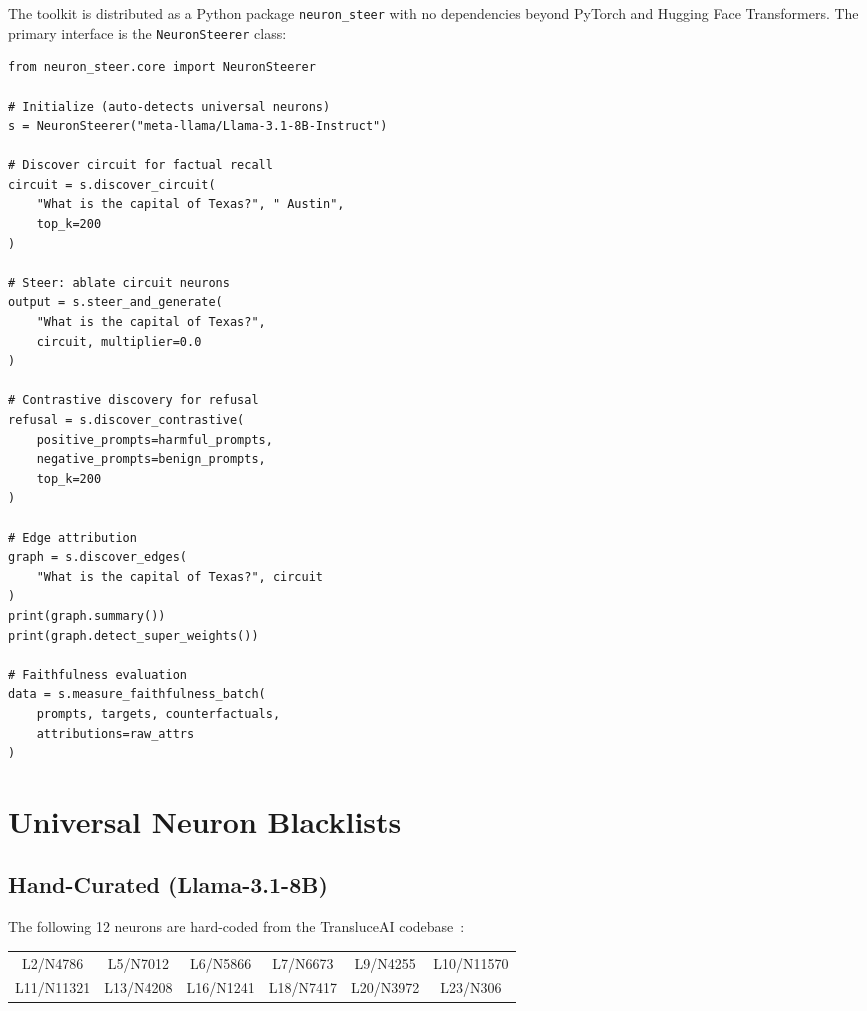\documentclass[11pt]{article}
\begin{document}
The toolkit is distributed as a Python package \texttt{neuron\_steer} with no dependencies beyond PyTorch and Hugging Face Transformers.
The primary interface is the \texttt{NeuronSteerer} class:

\begin{verbatim}
from neuron_steer.core import NeuronSteerer

# Initialize (auto-detects universal neurons)
s = NeuronSteerer("meta-llama/Llama-3.1-8B-Instruct")

# Discover circuit for factual recall
circuit = s.discover_circuit(
    "What is the capital of Texas?", " Austin",
    top_k=200
)

# Steer: ablate circuit neurons
output = s.steer_and_generate(
    "What is the capital of Texas?",
    circuit, multiplier=0.0
)

# Contrastive discovery for refusal
refusal = s.discover_contrastive(
    positive_prompts=harmful_prompts,
    negative_prompts=benign_prompts,
    top_k=200
)

# Edge attribution
graph = s.discover_edges(
    "What is the capital of Texas?", circuit
)
print(graph.summary())
print(graph.detect_super_weights())

# Faithfulness evaluation
data = s.measure_faithfulness_batch(
    prompts, targets, counterfactuals,
    attributions=raw_attrs
)
\end{verbatim}


\section{Universal Neuron Blacklists}
\label{sec:blacklist_appendix}

\subsection{Hand-Curated (Llama-3.1-8B)}

The following 12 neurons are hard-coded from the TransluceAI codebase~\citep{arora2025circuits}:

\begin{center}
\begin{small}
\begin{tabular}{cccccc}
\toprule
L2/N4786 & L5/N7012 & L6/N5866 & L7/N6673 & L9/N4255 & L10/N11570 \\
L11/N11321 & L13/N4208 & L16/N1241 & L18/N7417 & L20/N3972 & L23/N306 \\
\bottomrule
\end{tabular}
\end{small}
\end{center}
\end{document}
